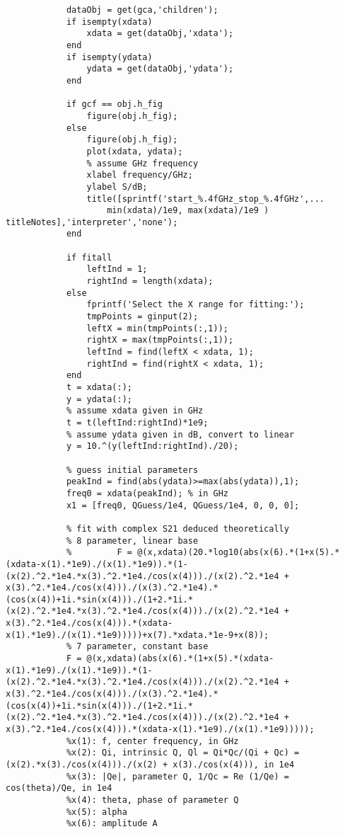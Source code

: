 \begin{lstlisting}
            dataObj = get(gca,'children');
            if isempty(xdata)
                xdata = get(dataObj,'xdata');
            end
            if isempty(ydata)
                ydata = get(dataObj,'ydata');
            end
            
            if gcf == obj.h_fig
                figure(obj.h_fig);
            else
                figure(obj.h_fig);
                plot(xdata, ydata);
                % assume GHz frequency
                xlabel frequency/GHz;
                ylabel S/dB;
                title([sprintf('start_%.4fGHz_stop_%.4fGHz',...
                    min(xdata)/1e9, max(xdata)/1e9 ) titleNotes],'interpreter','none');
            end
                
            if fitall
                leftInd = 1;
                rightInd = length(xdata);
            else
                fprintf('Select the X range for fitting:');
                tmpPoints = ginput(2);
                leftX = min(tmpPoints(:,1));
                rightX = max(tmpPoints(:,1));
                leftInd = find(leftX < xdata, 1);
                rightInd = find(rightX < xdata, 1);
            end
            t = xdata(:);
            y = ydata(:);
            % assume xdata given in GHz
            t = t(leftInd:rightInd)*1e9;
            % assume ydata given in dB, convert to linear
            y = 10.^(y(leftInd:rightInd)./20);

            % guess initial parameters
            peakInd = find(abs(ydata)>=max(abs(ydata)),1);
            freq0 = xdata(peakInd); % in GHz
            x1 = [freq0, QGuess/1e4, QGuess/1e4, 0, 0, 0];

            % fit with complex S21 deduced theoretically
            % 8 parameter, linear base
            %         F = @(x,xdata)(20.*log10(abs(x(6).*(1+x(5).*(xdata-x(1).*1e9)./(x(1).*1e9)).*(1-(x(2).^2.*1e4.*x(3).^2.*1e4./cos(x(4)))./(x(2).^2.*1e4 + x(3).^2.*1e4./cos(x(4)))./(x(3).^2.*1e4).*(cos(x(4))+1i.*sin(x(4)))./(1+2.*1i.*(x(2).^2.*1e4.*x(3).^2.*1e4./cos(x(4)))./(x(2).^2.*1e4 + x(3).^2.*1e4./cos(x(4))).*(xdata-x(1).*1e9)./(x(1).*1e9)))))+x(7).*xdata.*1e-9+x(8));
            % 7 parameter, constant base
            F = @(x,xdata)(abs(x(6).*(1+x(5).*(xdata-x(1).*1e9)./(x(1).*1e9)).*(1-(x(2).^2.*1e4.*x(3).^2.*1e4./cos(x(4)))./(x(2).^2.*1e4 + x(3).^2.*1e4./cos(x(4)))./(x(3).^2.*1e4).*(cos(x(4))+1i.*sin(x(4)))./(1+2.*1i.*(x(2).^2.*1e4.*x(3).^2.*1e4./cos(x(4)))./(x(2).^2.*1e4 + x(3).^2.*1e4./cos(x(4))).*(xdata-x(1).*1e9)./(x(1).*1e9)))));
            %x(1): f, center frequency, in GHz
            %x(2): Qi, intrinsic Q, Ql = Qi*Qc/(Qi + Qc) =  (x(2).*x(3)./cos(x(4)))./(x(2) + x(3)./cos(x(4))), in 1e4
            %x(3): |Qe|, parameter Q, 1/Qc = Re (1/Qe) = cos(theta)/Qe, in 1e4
            %x(4): theta, phase of parameter Q
            %x(5): alpha
            %x(6): amplitude A


\end{lstlisting}
